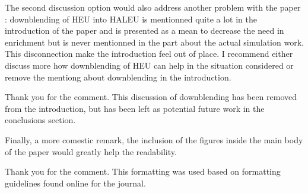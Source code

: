 \documentclass[answers,11pt]{exam}
\begin{document}
\begin{questions}
        \question The second discussion option would also address another problem 
        with the paper : downblending of HEU into HALEU is mentionned quite a lot 
        in the introduction of the paper and is presented as a mean to decrease 
        the need in enrichment but is never mentionned in the part about the actual 
        simulation work. This disconnection make the introduction feel out of place.
        I recommend either discuss more how downblending of HEU can help in the 
        situation considered or remove the mentiong about downblending in the 
        introduction.
        \begin{solution}
                Thank you for the comment. This discussion of downblending has been 
                removed from the introduction, but has been left as potential future 
                work in the conclusions section. 
        \end{solution}
        
        \question Finally, a more comestic remark, the inclusion of the figures 
        inside the main body of the paper would greatly help the readability.

        \begin{solution}
        	Thank you for the comment. This formatting was used based on 
                formatting guidelines found online for the journal. 

        \end{solution}
\end{questions}
\end{document}
